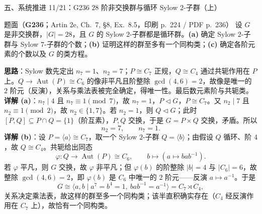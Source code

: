 \documentclass[aspectratio=169,10pt,fontset=none]{ctexbeamer}
\newcommand{\ex}[1]{\textcolor{accent}{\footnotesize\bfseries #1}}
\newcommand{\key}[1]{\textcolor{ink}{\bfseries #1}}
\begin{document}
\begin{frame}[t]{五、系统推进 11/21：G236 $28$ 阶非交换群与循环 Sylow $2$-子群（上）}
\label{ex:G236}
\scriptsize
\begin{block}{\footnotesize 题面（\ex{G236}；Artin 2e, Ch.~7, §8, Ex.~8.5，印刷 p.~224 / PDF p.~236）}
设 $G$ 是非交换群，$|G|=28$，且 $G$ 的 Sylow $2$-子群都是循环群。\textbf{(a)} 确定 Sylow $2$-子群与 Sylow $7$-子群的个数；\textbf{(b)} 证明这样的群至多有一个同构类；\textbf{(c)} 确定各阶元素的个数以及 $G$ 的类方程。
\end{block}
\key{思路}：Sylow 数先定出 $n_7=1$、$n_2=7$；$P\cong C_7$ 正规，$Q\cong C_4$ 通过共轭作用在 $P$ 上。$Q\to\operatorname{Aut}(P)\cong C_6$ 的像非平凡且阶整除 $\gcd(4,6)=2$，故像是唯一的 $2$ 阶元（反演），关系与乘法表被完全确定，得唯一性。最后数元素阶与共轭类。
\key{详解 (a)}：$n_7\mid 4$ 且 $n_7\equiv1\pmod 7$，故 $n_7=1$，$P\triangleleft G$，$P\cong C_7$。又 $n_2\mid 7$ 且 $n_2\equiv1\pmod 2$，故 $n_2\in\{1,7\}$。若 $n_2=1$，则 $Q\triangleleft G$；此时 $[P,Q]\subseteq P\cap Q=\{1\}$（阶互素），$P,Q$ 交换，于是 $G=P\times Q$ 交换，矛盾。所以
\[ n_2=7,\qquad n_7=1. \]
\key{详解 (b)}：设 $P=\langle a\rangle\cong C_7$，取一个 Sylow $2$-子群 $Q=\langle b\rangle$；由假设 $Q$ 循环、阶 $4$，故 $Q\cong C_4$。共轭给出同态
\[ \varphi:Q\longrightarrow\operatorname{Aut}(P)\cong C_6,\qquad b\longmapsto(a\mapsto bab^{-1}). \]
若 $\varphi$ 平凡，则 $G$ 交换，故 $\varphi$ 非平凡；但 $\varphi(b)$ 的阶整除 $|b|=4$ 与 $|C_6|=6$，故整除 $\gcd(4,6)=2$，即 $\varphi(b)$ 是 $C_6$ 中唯一的 $2$ 阶元——反演 $a\mapsto a^{-1}$。于是
\[ G\cong\langle a,b\mid a^7=b^4=1,\ bab^{-1}=a^{-1}\rangle=C_7\rtimes C_4, \]
关系决定乘法表，故这样的群至多一个同构类；该半直积确实存在（$C_4$ 经反演作用在 $C_7$ 上），故恰有一个同构类。
\end{frame}
\end{document}
